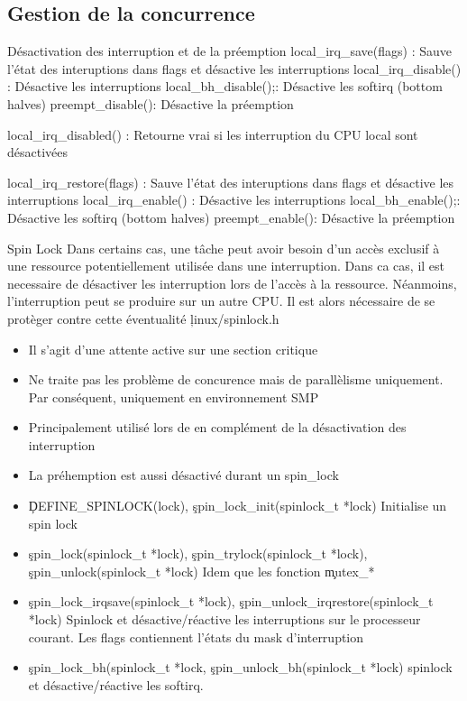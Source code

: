 \subsection{Gestion de la concurrence}

\begin{frame}{Désactivation des interruption et de la préemption}
local_irq_save(flags) : Sauve l'état des interuptions dans flags et désactive les interruptions 
local_irq_disable() : Désactive les interruptions
local_bh_disable();: Désactive les softirq (bottom halves)
preempt_disable(): Désactive la préemption

local_irq_disabled() : Retourne vrai si les interruption du CPU local sont désactivées

local_irq_restore(flags) : Sauve l'état des interuptions dans flags et désactive les interruptions 
local_irq_enable() : Désactive les interruptions
local_bh_enable();: Désactive les softirq (bottom halves)
preempt_enable(): Désactive la préemption
\end{frame} 

\begin{frame}{Spin Lock}
Dans certains cas,  une tâche peut avoir besoin
  d'un accès  exclusif à  une ressource potentiellement  utilisée dans
  une interruption. Dans  ca cas, il est necessaire  de désactiver les
  interruption   lors   de   l'accès   à  la   ressource.   Néanmoins,
  l'interruption  peut se  produire sur  un  autre CPU.  Il est  alors
  nécessaire de se protèger contre cette éventualité
  \c{linux/spinlock.h} 
\begin{itemize} 
\item Il s'agit d'une attente active sur une section critique
\item Ne traite pas les problème de concurence mais de parallèlisme uniquement. Par conséquent, uniquement en environnement SMP
\item Principalement utilisé lors de en complément de la désactivation des interruption
\item La préhemption est aussi désactivé durant un spin_lock
\end{itemize} 
\begin{itemize}
\item \c{DEFINE_SPINLOCK(lock)},  \c{spin_lock_init(spinlock_t *lock)} Initialise un spin lock
\item \c{spin_lock(spinlock_t *lock)}, \c{spin_trylock(spinlock_t *lock)}, \c{spin_unlock(spinlock_t *lock)} Idem que les fonction \c{mutex_*}
\item \c{spin_lock_irqsave(spinlock_t *lock)}, \c{spin_unlock_irqrestore(spinlock_t *lock)} Spinlock et désactive/réactive les interruptions sur le processeur courant. Les flags contiennent l'états du mask d'interruption
\item \c{spin_lock_bh(spinlock_t *lock}, \c{spin_unlock_bh(spinlock_t *lock)} spinlock et désactive/réactive les softirq.
\end{itemize} 
\end{frame} 

